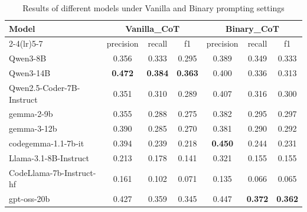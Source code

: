 \begin{table}[htbp]
  \centering
  \small
  \caption{Results of different models under Vanilla and Binary prompting settings}
  \label{tab:vanilla_binary_CoT}
  \setlength{\tabcolsep}{6pt}
  \renewcommand{\arraystretch}{1.15}
  \begin{tabular}{l*{6}{c}}
    \toprule
    \multirow{2}{*}{Model} &
      \multicolumn{3}{c}{Vanilla\_CoT} &
      \multicolumn{3}{c}{Binary\_CoT} \\
    \cmidrule(lr){2-4}\cmidrule(lr){5-7}
    & precision & recall & f1
    & precision & recall & f1 \\
    \midrule
    Qwen3-8B                  & 0.356 & 0.333 & 0.295 & 0.389 & 0.349 & 0.333 \\
    Qwen3-14B                 & \textbf{0.472} & \textbf{0.384} & \textbf{0.363} & 0.400 & 0.336 & 0.313 \\
    Qwen2.5-Coder-7B-Instruct & 0.351 & 0.310 & 0.289 & 0.407 & 0.316 & 0.300 \\
    gemma-2-9b                & 0.355 & 0.288 & 0.275 & 0.382 & 0.295 & 0.297 \\
    gemma-3-12b               & 0.390 & 0.285 & 0.270 & 0.381 & 0.290 & 0.292 \\
    codegemma-1.1-7b-it       & 0.394 & 0.239 & 0.218 & \textbf{0.450} & 0.244 & 0.231 \\
    Llama-3.1-8B-Instruct     & 0.213 & 0.178 & 0.141 & 0.321 & 0.155 & 0.155 \\
    CodeLlama-7b-Instruct-hf  & 0.161 & 0.102 & 0.071 & 0.135 & 0.066 & 0.065 \\
    gpt-oss-20b               & 0.427 & 0.359 & 0.345 & 0.447 & \textbf{0.372} & \textbf{0.362} \\
    \bottomrule
  \end{tabular}
\end{table}